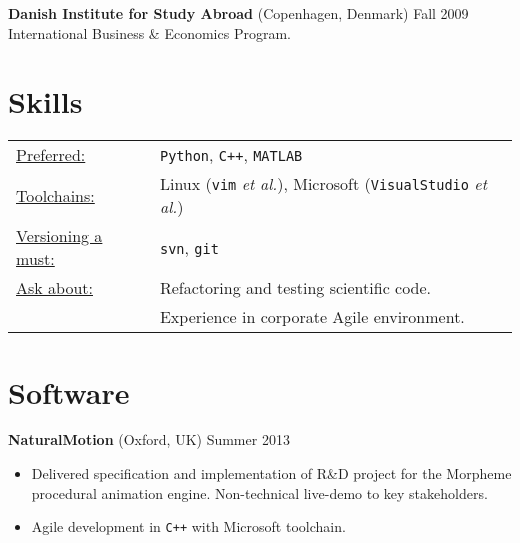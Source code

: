 \documentclass[margin]{res}
\newcommand{\locdatesubsection}[3]{\textbf{#1} (#2) \hfill #3}
\begin{document}
\begin{sloppypar}
\begin{resume}
\locdatesubsection{Danish Institute for Study Abroad}{Copenhagen, Denmark}{Fall 2009}\\
International Business \& Economics Program.

\section{Skills}
   \begin{tabular}{l p{3in}}
    \underline{Preferred:} & \texttt{Python}, \texttt{C++}, \textsc{\texttt{MATLAB}} \\
    \underline{Toolchains:} & Linux (\texttt{vim} \textit{et al.}), Microsoft (\texttt{VisualStudio} \textit{et al.}) \\
    \underline{Versioning a must:} & \texttt{svn}, \texttt{git} \\
    \underline{Ask about:} & Refactoring and testing scientific code. \\
                           & Experience in corporate Agile environment.
\end{tabular}

\section{Software}
\locdatesubsection{NaturalMotion}{Oxford, UK}{Summer 2013}
\begin{itemize}
\item Delivered specification and implementation of R\&D project for the Morpheme procedural animation engine. Non-technical live-demo to key stakeholders.
\item Agile development in \texttt{C++} with Microsoft toolchain.
\end{itemize}


\end{resume}
\end{sloppypar}
\end{document}
